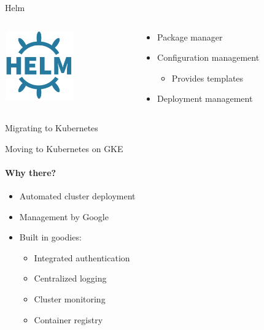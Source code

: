\documentclass[14pt]{beamer}
\newcommand{\imageframe}[2]{{
  \usebackgroundtemplate{\texttt{[image: \#1]}}
  \begin{frame}{\vspace{-6pt}\usebeamercolor[fg]{item}\huge{#2}}
  \end{frame}
}}
\begin{document}
  \begin{frame}{Helm}
    \begin{columns}[c]
      \begin{column}{.3\textwidth}
          \includegraphics[width=3cm,height=3cm]{images/helm_logo.png}
      \end{column}
      \begin{column}{.7\textwidth}
        \begin{itemize}
          \item Package manager
          \item Configuration management
          \begin{itemize}
            \item Provides templates
          \end{itemize}
          \item Deployment management
        \end{itemize}
      \end{column}
    \end{columns}
  \end{frame}


  \imageframe{images/migrating_cranes.jpg}{Migrating to Kubernetes}

  \begin{frame}{Moving to Kubernetes on GKE}
  \framesubtitle{Why there?}
  \begin{itemize}
    \item Automated cluster deployment
    \item Management by Google
    \item Built in goodies:
    \begin{itemize}
      \item Integrated authentication
      \item Centralized logging
      \item Cluster monitoring
      \item Container registry
    \end{itemize}
  \end{itemize}
  \end{frame}
\end{document}
